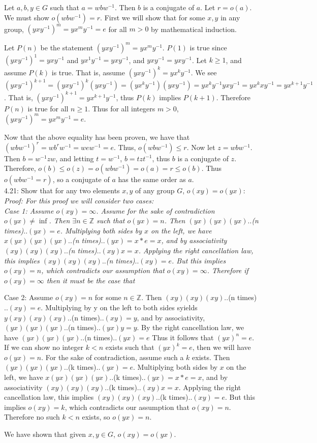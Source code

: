 \documentclass{scrartcl}
\begin{document}
Let $a,b,y \in G$ such that $a=wbw^{-1}$. Then $b$ is a conjugate of $a$. Let $r=o(a)$. We must show $o(wbw^{-1})=r$. First we will show that for some $x,y$ in any group, $(yxy^{-1})^m=yx^my^{-1}=e$ for all $m>0$ by mathematical induction.

Let $P(n)$ be the statement $(yxy^{-1})^m=yx^my^{-1}$. $P(1)$ is true since $(yxy^{-1})^1=yxy^{-1}$ and $yx^1y^{-1}=yxy^{-1}$, and $yxy^{-1}=yxy^{-1}$. Let $k\ge 1$, and assume $P(k)$ is true. That is, assume $(yxy^{-1})^k=yx^ky^{-1}$. We see $(yxy^{-1})^{k+1}=(yxy^{-1})^k(yxy^{-1})=(yx^ky^{-1})(yxy^{-1})=yx^ky^{-1}yxy^{-1}=yx^kxy^{-1}=yx^{k+1}y^{-1}$. That is, $(yxy^{-1})^{k+1}=yx^{k+1}y^{-1}$, thus $P(k)$ implies $P(k+1)$. Therefore $P(n)$ is true for all $n\ge 1$. Thus for all integers $m>0$, $(yxy^{-1})^m=yx^my^{-1}=e$.

Now that the above equality has been proven, we have that $(wbw^{-1})^r=wb^rw^{-1}=wew^{-1}=e$. Thus, $o(wbw^{-1})\le r$. Now let $z=wbw^{-1}$. Then $b=w^{-1}zw$, and letting $t=w^{-1}$, $b=tzt^{-1}$, thus $b$ is a conjugate of $z$. Therefore, $o(b)\le o(z) = o(wbw^{-1}) = o(a) = r \le o(b)$. Thus $o(wbw^{-1}=r)$, so a conjugate of $a$ has the same order as $a$.
\\ 

4.21: Show that for any two elements $x, y$ of any group $G$, $o(xy)=o(yx)$:\\

\em Proof: \em For this proof we will consider two cases:\\

Case 1: Assume $o(xy)=\infty$. Assume for the sake of contradiction $o(yx)\ne \inf$. Then $\exists n \in \mathbb{Z}$ such that $o(yx)=n$. Then $(yx)(yx)(yx)..$(n times)$..(yx) = e$. Multiplying both sides by $x$ on the left, we have $x(yx)(yx)(yx)..$(n times)$..(yx) = x*e = x$, and by associativity $(xy)(xy)(xy)..$(n times)$..(xy)x = x$. Applying the right cancellation law, this implies $(xy)(xy)(xy)..$(n times)$..(xy) = e$. But this implies $o(xy)=n$, which contradicts our assumption that $o(xy)=\infty$. Therefore if $o(xy)=\infty$ then it must be the case that 

Case 2: Assume $o(xy)=n$ for some $n \in \mathbb{Z}$. Then $(xy)(xy)(xy)..$(n times)$..(xy) = e$. Multiplying by y on the left to both sides syields $y(xy)(xy)(xy)..$(n times)$..(xy) = y$, and by associativity, $(yx)(yx)(yx)..$(n times)$..(yx)y = y$. By the right cancellation law, we have $(yx)(yx)(yx)..$(n times)$..(yx) = e$ Thus it follows that $(yx)^n=e$. If we can show no integer $k<n$ exists such that $(yx)^k=e$, then we will have $o(yx)=n$. For the sake of contradiction, assume such a $k$ exists. Then $(yx)(yx)(yx)..$(k times)$..(yx) = e$. Multiplying both sides by $x$ on the left, we have $x(yx)(yx)(yx)..$(k times)$..(yx) = x*e = x$, and by associativity $(xy)(xy)(xy)..$(k times)$..(xy)x = x$. Applying the right cancellation law, this implies $(xy)(xy)(xy)..$(k times)$..(xy) = e$. But this implies $o(xy)=k$, which contradicts our assumption that $o(xy)=n$. Therefore no such $k<n$ exists, so $o(yx)=n$.

We have shown that given $x,y \in G$, $o(xy)=o(yx)$.
\end{document}
